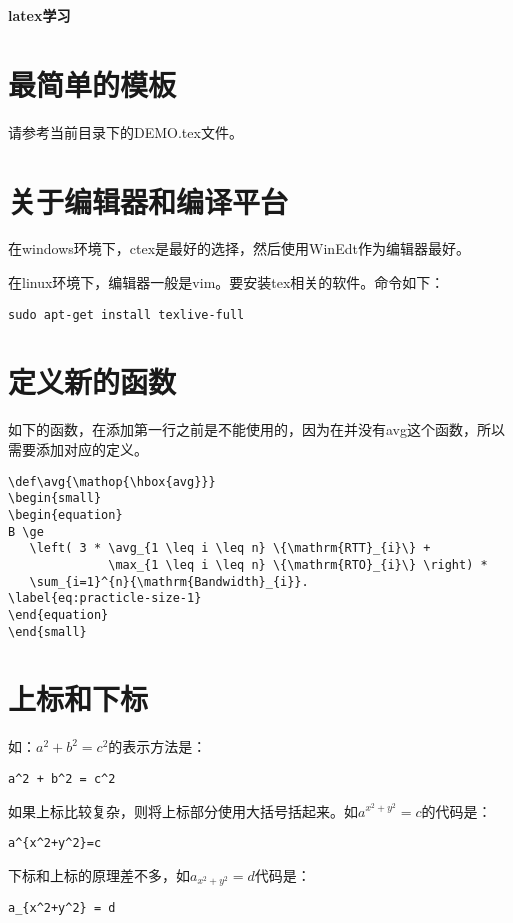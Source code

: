 \documentclass[a4paper,12pt]{ctexart}
\begin{document}
\begin{center}
\huge \textbf{latex学习}
\end{center}

\tableofcontents

\newpage
\section{最简单的模板}
请参考当前目录下的DEMO.tex文件。




\section{关于编辑器和编译平台}
在windows环境下，ctex是最好的选择，然后使用WinEdt作为编辑器最好。

在linux环境下，编辑器一般是vim。要安装tex相关的软件。命令如下：
\begin{verbatim}
sudo apt-get install texlive-full
\end{verbatim}




\section{定义新的函数}
如下的函数，在添加第一行之前是不能使用的，因为在并没有avg这个函数，所以需要添加对应的定义。
\begin{verbatim}
\def\avg{\mathop{\hbox{avg}}}
\begin{small}
\begin{equation}
B \ge
   \left( 3 * \avg_{1 \leq i \leq n} \{\mathrm{RTT}_{i}\} +
              \max_{1 \leq i \leq n} \{\mathrm{RTO}_{i}\} \right) *
   \sum_{i=1}^{n}{\mathrm{Bandwidth}_{i}}.
\label{eq:practicle-size-1}
\end{equation}
\end{small}
\end{verbatim}




\section{上标和下标}
如：$a^2 + b^2 = c^2$的表示方法是：
\begin{verbatim}
a^2 + b^2 = c^2
\end{verbatim}
如果上标比较复杂，则将上标部分使用大括号括起来。如$a^{x^2+y^2}=c$的代码是：
\begin{verbatim}
a^{x^2+y^2}=c
\end{verbatim}
下标和上标的原理差不多，如$a_{x^2+y^2} = d$代码是：
\begin{verbatim}
a_{x^2+y^2} = d
\end{verbatim}
\end{document}
